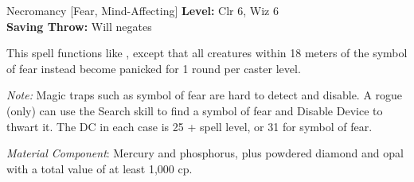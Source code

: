 {Necromancy [Fear, Mind-Affecting]}
{
	\textbf{Level:}
	Clr 6, Wiz 6\\
	\textbf{Saving Throw:}
	Will negates\\
}
{
	This spell functions like , except that all creatures within 18 meters of the symbol of fear instead become panicked for 1 round per caster level.

	\textit{Note:} Magic traps such as symbol of fear are hard to detect and disable. A rogue (only) can use the Search skill to find a symbol of fear and Disable Device to thwart it. The DC in each case is 25 + spell level, or 31 for symbol of fear.

	\textit{Material Component}:
	Mercury and phosphorus, plus powdered diamond and opal with a total value of at least 1,000 cp.

}
